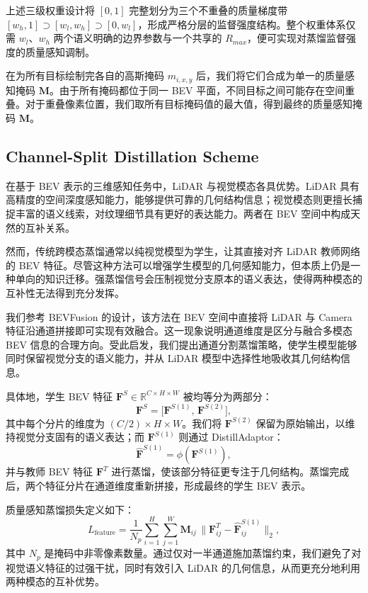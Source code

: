 \documentclass[12pt, UTF8]{ctexart}
\begin{document}
上述三级权重设计将 $[0,1]$ 完整划分为三个不重叠的质量梯度带 $[w_h, 1] \supset [w_l, w_h] \supset [0, w_l]$，形成严格分层的监督强度结构。整个权重体系仅需 $w_l$、$w_h$ 两个语义明确的边界参数与一个共享的 $R_{max}$，便可实现对蒸馏监督强度的质量感知调制。

在为所有目标绘制完各自的高斯掩码 $m_{i,x,y}$ 后，我们将它们合成为单一的质量感知掩码 $\mathbf{M}$。由于所有掩码都位于同一 BEV 平面，不同目标之间可能存在空间重叠。对于重叠像素位置，我们取所有目标掩码值的最大值，得到最终的质量感知掩码 $\mathbf{M}$。

\subsection{Channel-Split Distillation Scheme}

在基于 BEV 表示的三维感知任务中，LiDAR 与视觉模态各具优势。LiDAR 具有高精度的空间深度感知能力，能够提供可靠的几何结构信息；视觉模态则更擅长捕捉丰富的语义线索，对纹理细节具有更好的表达能力。两者在 BEV 空间中构成天然的互补关系。

然而，传统跨模态蒸馏通常以纯视觉模型为学生，让其直接对齐 LiDAR 教师网络的 BEV 特征。尽管这种方法可以增强学生模型的几何感知能力，但本质上仍是一种单向的知识迁移。强蒸馏信号会压制视觉分支原本的语义表达，使得两种模态的互补性无法得到充分发挥。

我们参考 BEVFusion 的设计，该方法在 BEV 空间中直接将 LiDAR 与 Camera 特征沿通道拼接即可实现有效融合。这一现象说明通道维度是区分与融合多模态 BEV 信息的合理方向。受此启发，我们提出通道分割蒸馏策略，使学生模型能够同时保留视觉分支的语义能力，并从 LiDAR 模型中选择性地吸收其几何结构信息。

具体地，学生 BEV 特征 $\mathbf{F}^{S} \in \mathbb{R}^{C \times H \times W}$ 被均等分为两部分：
\[
\mathbf{F}^{S} =
\big[
\mathbf{F}^{S(1)},\,
\mathbf{F}^{S(2)}
\big],
\]
其中每个分片的维度为 $(C/2)\times H\times W$。我们将 $\mathbf{F}^{S(2)}$ 保留为原始输出，以维持视觉分支固有的语义表达；而 $\mathbf{F}^{S(1)}$ 则通过 DistillAdaptor：
\[
\hat{\mathbf{F}}^{S(1)} = \phi\!\left(\mathbf{F}^{S(1)}\right),
\]
并与教师 BEV 特征 $\mathbf{F}^{T}$ 进行蒸馏，使该部分特征更专注于几何结构。蒸馏完成后，两个特征分片在通道维度重新拼接，形成最终的学生 BEV 表示。

质量感知蒸馏损失定义如下：
\[
L_{\text{feature}}
=
\frac{1}{N_p}
\sum_{i=1}^{H}\sum_{j=1}^{W}
\mathbf{M}_{ij}
\,
\big\lVert
\mathbf{F}^{T}_{ij}
-
\hat{\mathbf{F}}^{S(1)}_{ij}
\big\rVert_2 ,
\]
其中 $N_p$ 是掩码中非零像素数量。通过仅对一半通道施加蒸馏约束，我们避免了对视觉语义特征的过强干扰，同时有效引入 LiDAR 的几何信息，从而更充分地利用两种模态的互补优势。
\end{document}

